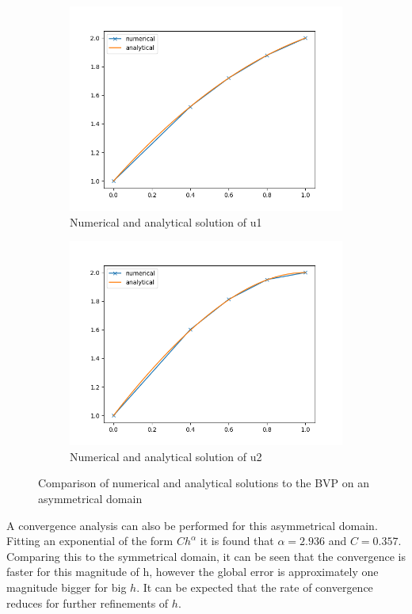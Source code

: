 \documentclass{article}
\begin{document}
\begin{figure}[H]
    \begin{subfigure}{.5\textwidth}
      \centering
      \includegraphics[width=.9\linewidth]{u1asym.png}
      \caption{Numerical and analytical solution of u1}
    \end{subfigure}%
    \begin{subfigure}{.5\textwidth}
      \centering
      \includegraphics[width=.9\linewidth]{u2asym.png}
      \caption{Numerical and analytical solution of u2}
    \end{subfigure}
    \caption{Comparison of numerical and analytical solutions to the BVP on an asymmetrical domain}
\end{figure}
A convergence analysis can also be performed for this asymmetrical domain. Fitting an exponential of the form $Ch^{\alpha}$ it is found that $\alpha=2.936$ and $C=0.357$. Comparing this to the symmetrical domain, it can be seen that the convergence is faster for this magnitude of h, however the global error is  approximately one magnitude bigger for big $h$. It can be expected that the rate of convergence reduces for further refinements of $h$.
\end{document}
